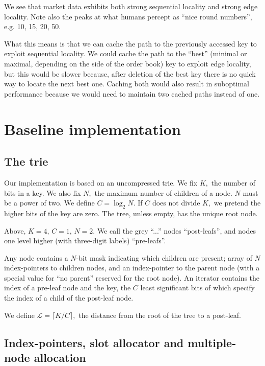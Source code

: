 \documentclass[a4paper,12pt]{article}
\begin{document}
We see that market data exhibits both strong sequential locality and strong edge locality.
Note also the peaks at what humans percept as ``nice round numbers'', e.g. 10, 15, 20, 50.

What this means is that we can cache the path to the previously accessed key to exploit sequential locality.
We could cache the path to the ``best'' (minimal or maximal, depending on the side of the order book) key to exploit edge locality,
but this would be slower because, after deletion of the best key there is no quick way to locate the next best one.
Caching both would also result in suboptimal performance because we would need to maintain two cached paths instead of one.

\section{Baseline implementation}

\subsection{The trie}

Our implementation is based on an uncompressed trie.
We fix $K,$ the number of bits in a key.
We also fix $N,$ the maximum number of children of a node. $N$ must be a power of two. We define $C = \log_2 N.$
If $C$ does not divide $K,$ we pretend the higher bits of the key are zero.
The tree, unless empty, has the unique root node.


Above, $K = 4, \, C = 1, \, N = 2.$
We call the grey ``...'' nodes ``post-leafs'', and nodes one level higher (with three-digit labels) ``pre-leafs''.

Any node contains a $N$-bit mask indicating which children are present; array of $N$ index-pointers to children nodes, and an index-pointer to the parent node (with a special value for ``no parent'' reserved for the root node).
An iterator contains the index of a pre-leaf node and the key, the $C$ least significant bits of which specify the index of a child of the post-leaf node.

We define $\mathcal{L} = \lceil K / C \rceil,$ the distance from the root of the tree to a post-leaf.

\subsection{Index-pointers, slot allocator and multiple-node allocation}
\end{document}
